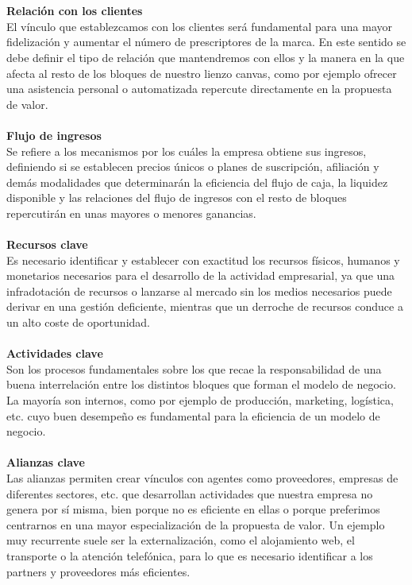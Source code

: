 \documentclass[twoside,twocolumn]{article}
\begin{document}
\begin{flushright}
\begin{itemize}
\textbf{}\\\textbf{}\\
\textbf{Relación con los clientes}\\
El vínculo que establezcamos con los clientes será fundamental para una mayor fidelización y aumentar el número de prescriptores de la marca. En este sentido se debe definir el tipo de relación que mantendremos con ellos y la manera en la que afecta al resto de los bloques de nuestro lienzo canvas, como por ejemplo ofrecer una asistencia personal o automatizada repercute directamente en la propuesta de valor.
\textbf{}\\\textbf{}\\
\textbf{Flujo de ingresos}\\
Se refiere a los mecanismos por los cuáles la empresa obtiene sus ingresos, definiendo si se establecen precios únicos o planes de suscripción, afiliación y demás modalidades que determinarán la eficiencia del flujo de caja, la liquidez disponible y las relaciones del flujo de ingresos con el resto de bloques repercutirán en unas mayores o menores ganancias.
\textbf{}\\\textbf{}\\
\textbf{Recursos clave}\\
Es necesario identificar y establecer con exactitud los recursos físicos, humanos y monetarios necesarios para el desarrollo de la actividad empresarial, ya que una infradotación de recursos o lanzarse al mercado sin los medios necesarios puede derivar en una gestión deficiente, mientras que un derroche de recursos conduce a un alto coste de oportunidad.
\textbf{}\\\textbf{}\\
\textbf{Actividades clave}\\
Son los procesos fundamentales sobre los que recae la responsabilidad de una buena interrelación entre los distintos bloques que forman el modelo de negocio. La mayoría son internos, como por ejemplo de producción, marketing, logística, etc. cuyo buen desempeño es fundamental para la eficiencia de un modelo de negocio.
\textbf{}\\\textbf{}\\
\textbf{Alianzas clave}\\
Las alianzas permiten crear vínculos con agentes como proveedores, empresas de diferentes sectores, etc. que desarrollan actividades que nuestra empresa no genera por sí misma, bien porque no es eficiente en ellas o porque preferimos centrarnos en una mayor especialización de la propuesta de valor. Un ejemplo muy recurrente suele ser la externalización, como el alojamiento web, el transporte o la atención telefónica, para lo que es necesario identificar a los partners y proveedores más eficientes.

\end{itemize}
\end{flushright}
\end{document}
